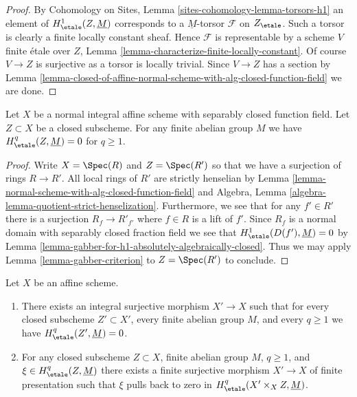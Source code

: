 \begin{proof}
By Cohomology on Sites, Lemma \ref{sites-cohomology-lemma-torsors-h1}
an element of $H^1_\etale(Z, \underline{M})$ corresponds to a
$\underline{M}$-torsor $\mathcal{F}$ on $Z_\etale$.
Such a torsor is clearly a finite locally constant sheaf.
Hence $\mathcal{F}$ is representable by a scheme $V$ finite
\'etale over $Z$, Lemma \ref{lemma-characterize-finite-locally-constant}.
Of course $V \to Z$ is surjective as a torsor is locally trivial.
Since $V \to Z$ has a section by
Lemma \ref{lemma-closed-of-affine-normal-scheme-with-alg-closed-function-field}
we are done.
\end{proof}

\begin{lemma}
\label{lemma-gabber-for-absolutely-algebraically-closed}
Let $X$ be a normal integral affine scheme with separably closed
function field. Let $Z \subset X$ be a closed subscheme.
For any finite abelian group $M$ we have
$H^q_\etale(Z, \underline{M}) = 0$ for $q \geq 1$.
\end{lemma}

\begin{proof}
Write $X = \Spec(R)$ and $Z = \Spec(R')$ so that we have a surjection
of rings $R \to R'$. All local rings of $R'$ are strictly henselian by
Lemma \ref{lemma-normal-scheme-with-alg-closed-function-field} and
Algebra, Lemma \ref{algebra-lemma-quotient-strict-henselization}.
Furthermore, we see that for any $f' \in R'$ there is a surjection
$R_f \to R'_{f'}$ where $f \in R$ is a lift of $f'$.
Since $R_f$ is a normal domain with separably closed fraction field
we see that $H^1_\etale(D(f'), \underline{M}) = 0$ by
Lemma \ref{lemma-gabber-for-h1-absolutely-algebraically-closed}.
Thus we may apply Lemma \ref{lemma-gabber-criterion} to $Z = \Spec(R')$
to conclude.
\end{proof}

\begin{lemma}
\label{lemma-integral-cover-trivial-cohomology}
Let $X$ be an affine scheme.
\begin{enumerate}
\item There exists an integral surjective morphism $X' \to X$ such that for
every closed subscheme $Z' \subset X'$, every finite abelian group $M$, and
every $q \geq 1$ we have $H^q_\etale(Z', \underline{M}) = 0$.
\item For any closed subscheme $Z \subset X$, finite abelian group $M$,
$q \geq 1$, and $\xi \in H^q_\etale(Z, \underline{M})$ there exists a
finite surjective morphism $X' \to X$ of finite presentation such that
$\xi$ pulls back to zero in $H^q_\etale(X' \times_X Z, \underline{M})$.
\end{enumerate}
\end{lemma}

